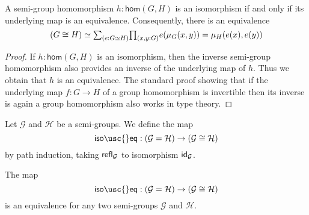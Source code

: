 \begin{lem}\label{lem:grp_iso}
  A semi-group homomorphism $h:\mathsf{hom}(G,H)$ is an isomorphism if and only if its underlying map is an equivalence. Consequently, there is an equivalence
  \begin{equation*}
    (G\cong H)\simeq \sm{e:G\simeq H}\prd{x,y:G}e(\mu_G(x,y))=\mu_H(e(x),e(y))
  \end{equation*}
\end{lem}

\begin{proof}
  If $h:\mathsf{hom}(G,H)$ is an isomorphism, then the inverse semi-group homomorphism also provides an inverse of the underlying map of $h$. Thus we obtain that $h$ is an equivalence. The standard proof showing that if the underlying map $f:G\to H$ of a group homomorphism is invertible then its inverse is again a group homomorphism also works in type theory.
\end{proof}

\begin{defn}
Let $\mathcal{G}$ and $\mathcal{H}$ be a semi-groups. We define the map
\begin{equation*}
\mathsf{iso\usc{}eq} : (\mathcal{G}=\mathcal{H})\to (\mathcal{G}\cong\mathcal{H})
\end{equation*}
by path induction, taking $\refl{\mathcal{G}}$ to isomorphism $\idfunc[\mathcal{G}]$.
\end{defn}

\begin{thm}\label{thm:iso-eq-semi-group}
The map
\begin{equation*}
\mathsf{iso\usc{}eq} : (\mathcal{G}=\mathcal{H})\to (\mathcal{G}\cong\mathcal{H})
\end{equation*}
is an equivalence for any two semi-groups $\mathcal{G}$ and $\mathcal{H}$.
\end{thm}

